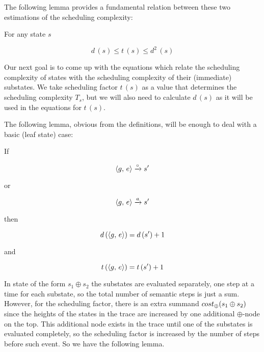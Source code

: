 The following lemma provides a fundamental relation between these two estimations of the scheduling complexity:

\begin{lemma}
  For any state $s$

  \[
  d\,(s) \le t\,(s) \le d^2\,(s)
  \]
  
\end{lemma}

Our next goal is to come up with the equations which relate the scheduling complexity of states with the scheduling complexity of their
(immediate) substates. We take scheduling factor $t\,(s)$ as a value that determines the scheduling complexity $T_s$, but we will also need to calculate $d\,(s)$ as it will be used in the equations for $t\,(s)$. 

The following lemma, obvious from the definitions, will be enough to deal with a basic (leaf state) case:

\begin{lemma}
  If

  \[\langle g ,\, e \rangle \xrightarrow{\circ} s^\prime\]

  or

  \[\langle g ,\, e \rangle \xrightarrow{a} s^\prime\]

  then

  \[d\,(\langle g ,\, e \rangle) = d\,(s^\prime) + 1\]

  and

  \[t\,(\langle g ,\, e \rangle) = t\,(s^\prime) + 1\]
\end{lemma}


In state of the form $s_1 \oplus s_2$ the substates are evaluated separately, one step at a time for
each substate, so the total number of semantic steps is just a sum.
However, for the scheduling factor, there is an extra summand $cost_{\oplus}(s_1 \oplus s_2)$ since the
heights of the states in the trace are increased by one additional $\oplus$-node on the top.
This additional node exists in the trace until one of the substates is evaluated completely,
so the scheduling factor is increased by the number of steps before such event.
So we have the following lemma.

